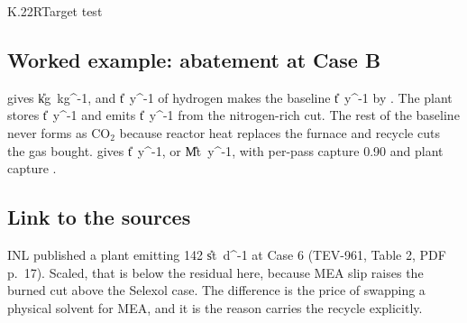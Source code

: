 \begin{eqcard}{K.22}{R}{Target test}
\end{eqcard}

\subsection*{Worked example: abatement at Case B}
 gives \vEbaseInt{} \U{kg\ kg^{-1}}, and \vMHtwoB{} \U{t\ y^{-1}} of hydrogen makes the baseline \vEbaseB{} \U{t\ y^{-1}} by . The plant stores \vEcapB{} \U{t\ y^{-1}} and emits \vEatmB{} \U{t\ y^{-1}} from the nitrogen-rich cut. The rest of the baseline never forms as CO$_2$ because reactor heat replaces the furnace and recycle cuts the gas bought.  gives \vAbateB{} \U{t\ y^{-1}}, or \vAbateMt{} \U{Mt\ y^{-1}}, with per-pass capture 0.90 and plant capture \vEtaPl.

\subsection*{Link to the sources}
INL published a plant emitting 142 \U{st\ d^{-1}} at Case 6 (TEV-961, Table 2, PDF p.~17). Scaled, that is below the residual here, because MEA slip raises the burned cut above the Selexol case. The difference is the price of swapping a physical solvent for MEA, and it is the reason  carries the recycle explicitly.
